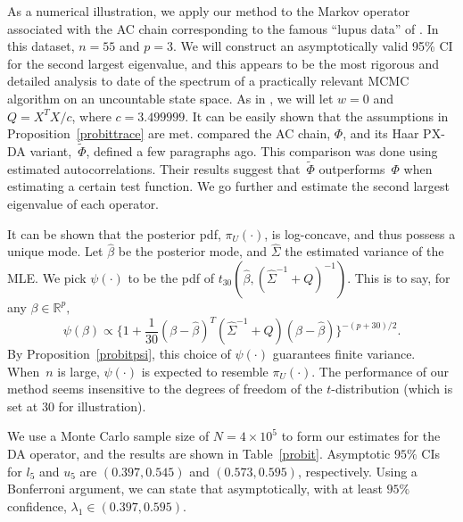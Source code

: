 \documentclass[11pt]{article}
\begin{document}
        As a numerical illustration, we apply our method to the Markov
        operator associated with the AC chain corresponding to the
        famous ``lupus data'' of \cite{van2001art}.  In this dataset,
        $n=55$ and $p=3$.  
        We will construct an
        asymptotically valid 95\% CI for the second largest eigenvalue, and
        this appears to be the most rigorous and detailed analysis to date of
        the spectrum of a practically relevant MCMC algorithm on an
        uncountable state space.
        As in \cite{chakraborty2016convergence}, we
        will let $w=0$ and $Q=X^TX/c$, where $c=3.499999$.  
        It can be easily
        shown that the assumptions in Proposition~\ref{probittrace}
        are met.  \cite{chakraborty2016convergence} compared the AC
        chain, $\Phi$, and its Haar PX-DA variant,~$\tilde{\Phi}$, defined a few paragraphs ago. This comparison
        was done using estimated autocorrelations.  Their results
        suggest that~$\tilde{\Phi}$ outperforms~$\Phi$
        when estimating a certain test function.  We go further and
        estimate the second largest eigenvalue of each operator.

	It can be shown that the posterior pdf, $\pi_{U}(\cdot)$, is log-concave, and thus possess a unique mode. Let $\hat{\beta}$ be the posterior mode, and $\hat{\Sigma}$
        the estimated variance of the MLE. We pick $\psi(\cdot)$ to
        be the pdf of $t_{30}(\hat{\beta},(\hat{\Sigma}^{-1}+Q)^{-1}).$ This is to say,
        for any $\beta \in \mathbb{R}^p,$
	\[
	\psi(\beta) \propto \Big\{ 1 + \frac{1}{30} (\beta-\hat{\beta})^T (\hat{\Sigma}^{-1}+Q) (\beta-\hat{\beta}) \Big\}^{-(p+30)/2}.
	\]
	By Proposition~\ref{probitpsi}, this choice of $\psi(\cdot)$
        guarantees finite variance. When~$n$ is large, $\psi(\cdot)$ is expected to resemble $\pi_U(\cdot)$. The performance of our method seems insensitive to the degrees of freedom of the $t$-distribution (which is set at 30 for illustration).
	
        We use a Monte Carlo sample size of $N = 4\times 10^5$ to
        form our estimates for the DA operator, and the results are
        shown in Table~\ref{probit}.  Asymptotic $95\%$ CIs for $l_5$
        and $u_5$ are $(0.397,0.545)$ and $(0.573,0.595)$,
        respectively.  Using a Bonferroni argument, we can state that
        asymptotically, with at least $95\%$ confidence, $\lambda_1
        \in (0.397, 0.595)$.
\end{document}

